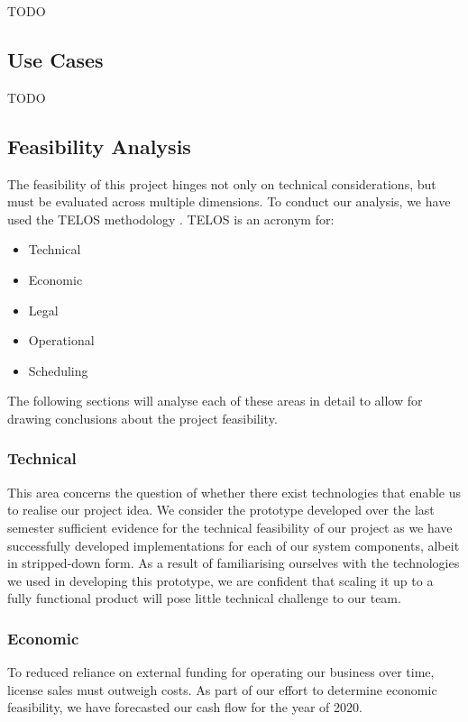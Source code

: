 \documentclass[main.tex]{subfiles}
\begin{document}
TODO

\subsection{Use Cases}
TODO

\subsection{Feasibility Analysis}
\label{Feasibility Analysis}

The feasibility of this project hinges not only on technical considerations, but must be evaluated across multiple dimensions. To conduct our analysis, we have used the TELOS methodology \cite{drljaca_latinovic_2018}. TELOS is an acronym for:

\begin{itemize}
    \item Technical
    \item Economic
    \item Legal
    \item Operational
    \item Scheduling
\end{itemize}

The following sections will analyse each of these areas in detail to allow for drawing conclusions about the project feasibility.

\subsubsection{Technical}

This area concerns the question of whether there exist technologies that enable us to realise our project idea. We consider the prototype developed over the last semester sufficient evidence for the technical feasibility of our project as we have successfully developed implementations for each of our system components, albeit in stripped-down form. As a result of familiarising ourselves with the technologies we used in developing this prototype, we are confident that scaling it up to a fully functional product will pose little technical challenge to our team.

\subsubsection{Economic}

To reduced reliance on external funding for operating our business over time, license sales must outweigh costs. As part of our effort to determine economic feasibility, we have forecasted our cash flow for the year of 2020.
\end{document}
